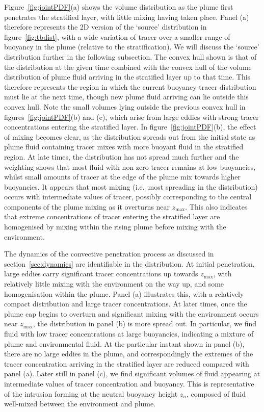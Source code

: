 \documentclass[a4paper]{article}
\begin{document}
Figure~\ref{fig:jointPDF}(a) shows the volume distribution as the plume first penetrates the stratified layer,
with little mixing having taken place. Panel (a) therefore represents the 2D version of the `source'
distribution in figure~\ref{fig:tbdist}, with a wide variation of tracer over a smaller range of buoyancy in
the plume (relative to the stratification). We will discuss the `source' distribution further in the following
subsection. The convex hull shown is that of the distribution at the given time combined with the convex hull
of the volume distribution of plume fluid arriving in the stratified layer up to that time. This
therefore represents the region in which the current buoyancy-tracer distribution must lie at the next time,
though new plume fluid arriving can lie outside this convex hull. Note the small volumes lying outside the
previous convex hull in figures~\ref{fig:jointPDF}(b) and (c), which arise from large eddies with strong tracer
concentrations entering the stratified layer. In figure~\ref{fig:jointPDF}(b), the effect of mixing becomes
clear, as the distribution spreads out from the initial state as plume fluid containing tracer mixes with more
buoyant fluid in the stratified region. At late times, the distribution has not spread much further and the
weighting shows that most fluid with non-zero tracer remains at low buoyancies, whilst small amounts of tracer
at the edge of the plume mix towards higher buoyancies. It appears that most mixing (i.e.\  most spreading in
the distribution) occurs with intermediate values of tracer, possibly corresponding to the central components
of the plume mixing as it overturns near $z_{\max}$. This also indicates that extreme concentrations of tracer
entering the stratified layer are homogenised by mixing within the rising plume before mixing with the
environment.

The dynamics of the convective penetration process as discussed in section~\ref{sec:dynamics} are identifiable
in the distribution. At initial penetration, large eddies carry significant tracer concentrations up towards
$z_{\max}$, with relatively little mixing with the environment on the way up, and some homogenisation within
the plume. Panel (a) illustrates this, with a relatively compact distribution and large tracer concentrations.
At later times, once the plume cap begins to overturn and significant mixing with the environment occurs near
$z_{\max}$, the distribution in panel (b) is more spread out. In particular, we find fluid with low tracer
concentrations at large buoyancies, indicating a mixture of plume and environmental fluid. At the particular
instant shown in panel (b), there are no large eddies in the plume, and correspondingly the extremes of the
tracer concentration arriving in the stratified layer are reduced compared with panel (a). Later still in
panel (c), we find significant volumes of fluid appearing at intermediate values of tracer concentration and
buoyancy. This is representative of the intrusion forming at the neutral buoyancy height $z_n$, composed of
fluid well-mixed between the environment and plume.
\end{document}
